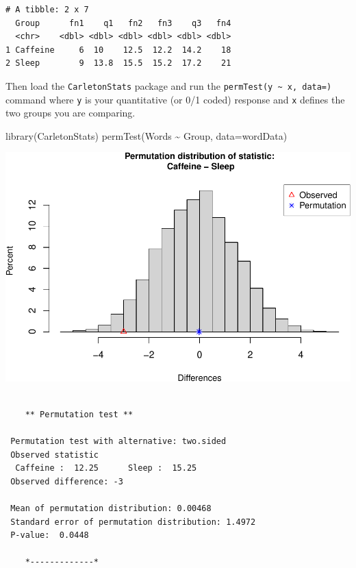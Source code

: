 \documentclass[
]{book}
\newenvironment{Shaded}{\begin{snugshade}}{\end{snugshade}}
\newcommand{\AttributeTok}[1]{\textcolor[rgb]{0.77,0.63,0.00}{#1}}
\newcommand{\FunctionTok}[1]{\textcolor[rgb]{0.00,0.00,0.00}{#1}}
\newcommand{\NormalTok}[1]{#1}
\newcommand{\SpecialCharTok}[1]{\textcolor[rgb]{0.00,0.00,0.00}{#1}}
\begin{document}
\begin{verbatim}
# A tibble: 2 x 7
  Group      fn1    q1   fn2   fn3    q3   fn4
  <chr>    <dbl> <dbl> <dbl> <dbl> <dbl> <dbl>
1 Caffeine     6  10    12.5  12.2  14.2    18
2 Sleep        9  13.8  15.5  15.2  17.2    21
\end{verbatim}

Then load the \texttt{CarletonStats} package and run the \texttt{permTest(y\ \textasciitilde{}\ x,\ data=)} command where \texttt{y} is your quantitative (or 0/1 coded) response and \texttt{x} defines the two groups you are comparing.

\begin{Shaded}
\begin{Highlighting}[]
\FunctionTok{library}\NormalTok{(CarletonStats)}
\FunctionTok{permTest}\NormalTok{(Words }\SpecialCharTok{\textasciitilde{}}\NormalTok{ Group, }\AttributeTok{data=}\NormalTok{wordData)}
\end{Highlighting}
\end{Shaded}

\includegraphics[width=1\linewidth]{Class_Activity_12_files/figure-latex/unnamed-chunk-3-1}

\begin{verbatim}

    ** Permutation test **

 Permutation test with alternative: two.sided 
 Observed statistic
  Caffeine :  12.25      Sleep :  15.25 
 Observed difference: -3 

 Mean of permutation distribution: 0.00468 
 Standard error of permutation distribution: 1.4972 
 P-value:  0.0448 

    *-------------*
\end{verbatim}
\end{document}
